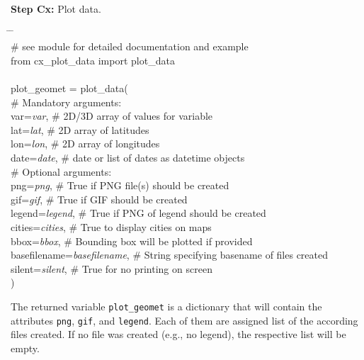 \documentclass[10pt,a4paper,titlepage,parskip]{scrartcl}
\newenvironment{ttfont}{\fontfamily{\ttdefault}\selectfont}{\par}
\newcommand{\GRAU}[1]{\textcolor{ufzgray2}{#1}}
\begin{document}
\textbf{Step Cx:} Plot data.
\begin{framed}
	\vspace*{-1.2cm}
	\begin{ttfont}
		\begin{tabbing}
			\hspace{1.0cm} \= \hspace{5.2cm} \= \kill \\[4pt]
			\GRAU{\# see module for detailed documentation and example}\\
			from cx\_plot\_data import plot\_data\\
			\\
			plot\_geomet = plot\_data(\\
			\> \GRAU{\# Mandatory arguments:}\\
			\> var=\textit{var}, \> \GRAU{\# 2D/3D array of values for variable}\\
			\> lat=\textit{lat}, \> \GRAU{\# 2D array of latitudes}\\
			\> lon=\textit{lon}, \> \GRAU{\# 2D array of longitudes}\\
			\> date=\textit{date}, \> \GRAU{\# date or list of dates as datetime objects}\\
			\> \GRAU{\# Optional arguments:}\\
			\> png=\textit{png}, \> \GRAU{\# True if PNG file(s) should be created}\\
			\> gif=\textit{gif}, \> \GRAU{\# True if GIF should be created}\\
			\> legend=\textit{legend}, \> \GRAU{\# True if PNG of legend should be created}\\
			\> cities=\textit{cities}, \> \GRAU{\# True to display cities on maps}\\
			\> bbox=\textit{bbox}, \> \GRAU{\# Bounding box will be plotted if provided}\\
			\> basefilename=\textit{basefilename}, \> \GRAU{\# String specifying basename of files created}\\
			\> silent=\textit{silent}, \> \GRAU{\# True for no printing on screen}\\
			\> ) \> 
		\end{tabbing}
	\end{ttfont}
	\vspace*{-0.3cm}
\end{framed}
\vspace*{-0.3cm}
The returned variable \texttt{plot\_geomet} is a dictionary that will contain the attributes \texttt{png}, \texttt{gif}, and \texttt{legend}. Each of them are assigned list of the according files created. If no file was created (e.g., no legend), the respective list will be empty.
\end{document}
